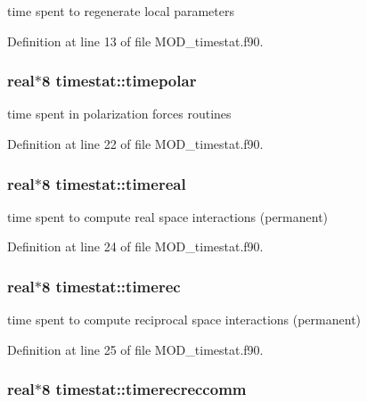 time spent to regenerate local parameters 



Definition at line 13 of file M\-O\-D\-\_\-timestat.\-f90.

\hypertarget{classtimestat_a745cff7d2b1bf3696c08cedec3d5c797}{
\subsubsection[{timepolar}]{\setlength{\rightskip}{0pt plus 5cm}real$\ast$8 timestat\-::timepolar}}\label{classtimestat_a745cff7d2b1bf3696c08cedec3d5c797}


time spent in polarization forces routines 



Definition at line 22 of file M\-O\-D\-\_\-timestat.\-f90.

\hypertarget{classtimestat_a14c3974861622792ed151280bf66ddd7}{
\subsubsection[{timereal}]{\setlength{\rightskip}{0pt plus 5cm}real$\ast$8 timestat\-::timereal}}\label{classtimestat_a14c3974861622792ed151280bf66ddd7}


time spent to compute real space interactions (permanent) 



Definition at line 24 of file M\-O\-D\-\_\-timestat.\-f90.

\hypertarget{classtimestat_a11214b085ac634ed9c666d849eae5270}{
\subsubsection[{timerec}]{\setlength{\rightskip}{0pt plus 5cm}real$\ast$8 timestat\-::timerec}}\label{classtimestat_a11214b085ac634ed9c666d849eae5270}


time spent to compute reciprocal space interactions (permanent) 



Definition at line 25 of file M\-O\-D\-\_\-timestat.\-f90.

\hypertarget{classtimestat_a953a0208aa2c3e69c391ffc813b2cd8d}{
\subsubsection[{timerecreccomm}]{\setlength{\rightskip}{0pt plus 5cm}real$\ast$8 timestat\-::timerecreccomm}}\label{classtimestat_a953a0208aa2c3e69c391ffc813b2cd8d}


